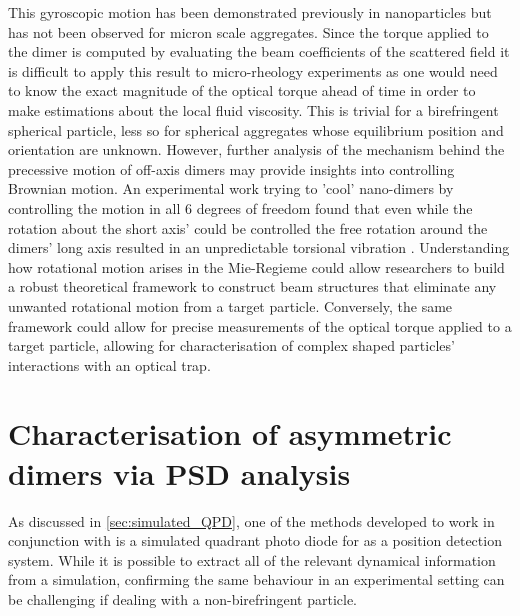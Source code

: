 This gyroscopic motion has been demonstrated previously in nanoparticles 
\cite{Zhu2021, Rashid2018, Hoang2016, Kuhn2016} but has not been observed 
for micron scale aggregates. Since the torque applied to the dimer is 
computed by evaluating the beam coefficients of the scattered field it is 
difficult to apply this result to micro-rheology experiments as one would 
need to know the exact magnitude of the optical torque ahead of time in 
order to make estimations about the local fluid viscosity. This is trivial 
for a birefringent spherical particle, less so for spherical aggregates 
whose equilibrium position and orientation are unknown. However, further 
analysis of the mechanism behind the precessive motion of off-axis dimers
may provide insights into controlling Brownian motion. An experimental work
trying to 'cool' nano-dimers by controlling the motion in all 6 degrees of 
freedom found that even while the rotation about the short axis' could be 
controlled the free rotation around the dimers' long axis resulted in an 
unpredictable torsional vibration \cite{Bang2020}. Understanding how 
rotational motion arises in the Mie-Regieme could allow researchers to 
build a robust theoretical framework to construct beam structures that 
eliminate any unwanted rotational motion from a target particle. Conversely, 
the same framework could allow for precise measurements of the optical 
torque applied to a target particle, allowing for characterisation of 
complex shaped particles' interactions with an optical trap. 

\section{Characterisation of asymmetric dimers via PSD analysis}
As discussed in \ref{sec:simulated_QPD}, one of the methods developed to 
work in conjunction with \cite{Vigilante2020} is a simulated quadrant photo 
diode for as a position detection system. While it is possible to extract 
all of the relevant dynamical information from a simulation, confirming 
the same behaviour in an experimental setting can be challenging if dealing
with a non-birefringent particle.  

